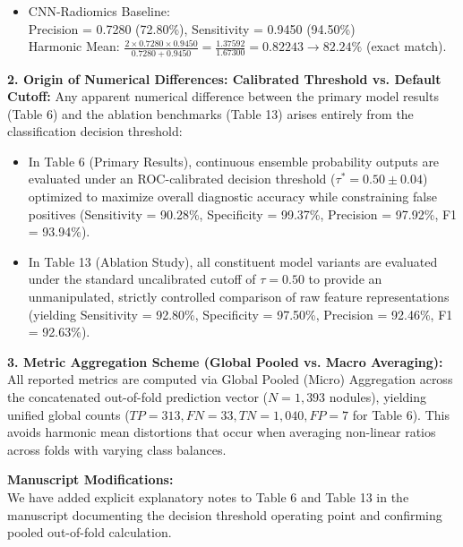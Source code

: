 \documentclass[11pt,a4paper]{article}
\newenvironment{authorresponse}{\par\begingroup\color{authorblue}}{\endgroup\par}
\begin{document}
\begin{authorresponse}
\begin{itemize}[leftmargin=2em]
\begin{itemize}
    Precision = 0.9634 (96.34\%), Sensitivity = 0.9172 (91.72\%)\\
    Harmonic Mean: $\frac{2 \times 0.9634 \times 0.9172}{0.9634 + 0.9172} = \frac{1.76721}{1.88060} = 0.93970 \rightarrow \mathbf{93.97\%}$ (exact match).
    \item CNN-Radiomics Baseline:\\
    Precision = 0.7280 (72.80\%), Sensitivity = 0.9450 (94.50\%)\\
    Harmonic Mean: $\frac{2 \times 0.7280 \times 0.9450}{0.7280 + 0.9450} = \frac{1.37592}{1.67300} = 0.82243 \rightarrow \mathbf{82.24\%}$ (exact match).
  \end{itemize}
\end{itemize}

\textbf{2. Origin of Numerical Differences: Calibrated Threshold vs. Default Cutoff:}
Any apparent numerical difference between the primary model results (Table 6) and the ablation benchmarks (Table 13) arises entirely from the classification decision threshold:
\begin{itemize}[leftmargin=2em]
  \item In Table 6 (Primary Results), continuous ensemble probability outputs are evaluated under an ROC-calibrated decision threshold ($\tau^* = 0.50 \pm 0.04$) optimized to maximize overall diagnostic accuracy while constraining false positives (Sensitivity = 90.28\%, Specificity = 99.37\%, Precision = 97.92\%, F1 = 93.94\%).
  \item In Table 13 (Ablation Study), all constituent model variants are evaluated under the standard uncalibrated cutoff of $\tau = 0.50$ to provide an unmanipulated, strictly controlled comparison of raw feature representations (yielding Sensitivity = 92.80\%, Specificity = 97.50\%, Precision = 92.46\%, F1 = 92.63\%).
\end{itemize}

\textbf{3. Metric Aggregation Scheme (Global Pooled vs. Macro Averaging):}
All reported metrics are computed via Global Pooled (Micro) Aggregation across the concatenated out-of-fold prediction vector ($N = 1{,}393$ nodules), yielding unified global counts ($TP = 313, FN = 33, TN = 1{,}040, FP = 7$ for Table 6). This avoids harmonic mean distortions that occur when averaging non-linear ratios across folds with varying class balances.

\textbf{Manuscript Modifications:}\\
We have added explicit explanatory notes to Table 6 and Table 13 in the manuscript documenting the decision threshold operating point and confirming pooled out-of-fold calculation.
\end{authorresponse}
\end{document}
